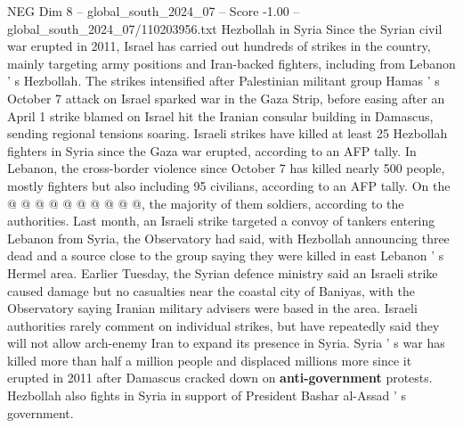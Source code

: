 \begin{textsample}{NEG Dim 8 – global\_south\_2024\_07 – Score -1.00 – global\_south\_2024\_07/110203956.txt}
Hezbollah in Syria Since the Syrian civil war erupted in 2011, Israel has carried out hundreds of strikes in the country, mainly targeting army positions and Iran-backed fighters, including from Lebanon ' s Hezbollah.
The strikes intensified after Palestinian militant group Hamas ' s October 7 attack on Israel sparked war in the Gaza Strip, before easing after an April 1 strike blamed on Israel hit the Iranian consular building in Damascus, sending regional tensions soaring.
Israeli strikes have killed at least 25 Hezbollah fighters in Syria since the Gaza war erupted, according to an AFP tally.
In Lebanon, the cross-border violence since October 7 has killed nearly 500 people, mostly fighters but also including 95 civilians, according to an AFP tally.
On the @ @ @ @ @ @ @ @ @ @, the majority of them soldiers, according to the authorities.
Last month, an Israeli strike targeted a convoy of tankers entering Lebanon from Syria, the Observatory had said, with Hezbollah announcing three dead and a source close to the group saying they were killed in east Lebanon ' s Hermel area.
Earlier Tuesday, the Syrian defence ministry said an Israeli strike caused damage but no casualties near the coastal city of Baniyas, with the Observatory saying Iranian military advisers were based in the area.
Israeli authorities rarely comment on individual strikes, but have repeatedly said they will not allow arch-enemy Iran to expand its presence in Syria.
Syria ' s war has killed more than half a million people and displaced millions more since it erupted in 2011 after Damascus cracked down on \textbf{anti-government} protests.
Hezbollah also fights in Syria in support of President Bashar al-Assad ' s government.

\end{textsample}
